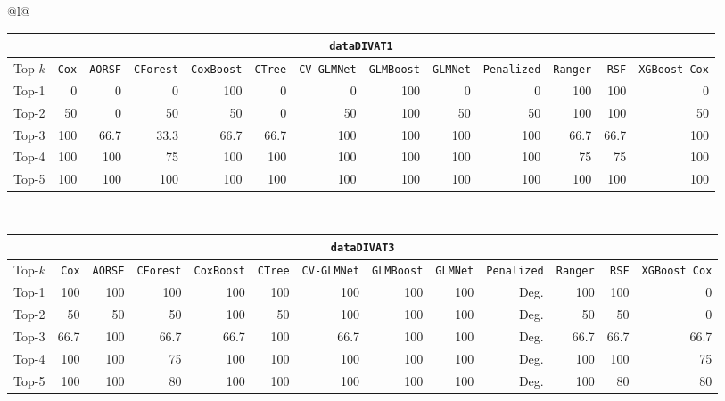 \begin{longtable}{@{}l@{}}
\begin{tabular}{@{}l*{12}{r}@{}}
\multicolumn{13}{c}{\texttt{dataDIVAT1}} \\
\midrule
Top-$k$ & \texttt{Cox} & \texttt{AORSF} & \texttt{CForest} & \texttt{CoxBoost} & \texttt{CTree} & \texttt{CV-GLMNet} & \texttt{GLMBoost} & \texttt{GLMNet} & \texttt{Penalized} & \texttt{Ranger} & \texttt{RSF} & \texttt{XGBoost Cox} \\
\midrule
Top-1 & 0 & 0 & 0 & 100 & 0 & 0 & 100 & 0 & 0 & 100 & 100 & 0 \\
Top-2 & 50 & 0 & 50 & 50 & 0 & 50 & 100 & 50 & 50 & 100 & 100 & 50 \\
Top-3 & 100 & 66.7 & 33.3 & 66.7 & 66.7 & 100 & 100 & 100 & 100 & 66.7 & 66.7 & 100 \\
Top-4 & 100 & 100 & 75 & 100 & 100 & 100 & 100 & 100 & 100 & 75 & 75 & 100 \\
Top-5 & 100 & 100 & 100 & 100 & 100 & 100 & 100 & 100 & 100 & 100 & 100 & 100 \\
\end{tabular} \\
\midrule

\begin{tabular}{@{}l*{12}{r}@{}}
\multicolumn{13}{c}{\texttt{dataDIVAT3}} \\
\midrule
Top-$k$ & \texttt{Cox} & \texttt{AORSF} & \texttt{CForest} & \texttt{CoxBoost} & \texttt{CTree} & \texttt{CV-GLMNet} & \texttt{GLMBoost} & \texttt{GLMNet} & \texttt{Penalized} & \texttt{Ranger} & \texttt{RSF} & \texttt{XGBoost Cox} \\
\midrule
Top-1 & 100 & 100 & 100 & 100 & 100 & 100 & 100 & 100 & Deg. & 100 & 100 & 0 \\
Top-2 & 50 & 50 & 50 & 100 & 50 & 100 & 100 & 100 & Deg. & 50 & 50 & 0 \\
Top-3 & 66.7 & 100 & 66.7 & 66.7 & 100 & 66.7 & 100 & 100 & Deg. & 66.7 & 66.7 & 66.7 \\
Top-4 & 100 & 100 & 75 & 100 & 100 & 100 & 100 & 100 & Deg. & 100 & 100 & 75 \\
Top-5 & 100 & 100 & 80 & 100 & 100 & 100 & 100 & 100 & Deg. & 100 & 80 & 80 \\
\end{tabular} \\
\midrule


\end{longtable}
